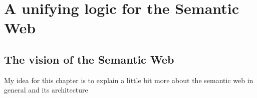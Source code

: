 \chapter{A unifying logic for the Semantic Web} \label{uni}












\section{The vision of the Semantic Web}
My idea for this chapter is to explain a little bit more about the semantic web in general and its architecture


